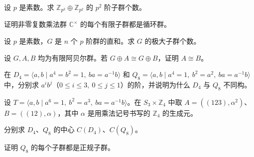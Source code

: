 \noindent\begin{minipage}{\textwidth}
设 $p$ 是素数。求 $\mathbb Z_{p^3}\oplus\mathbb Z_{p^2}$ 的 $p^2$ 阶子群个数。
\end{minipage}\par\vfill
\noindent\begin{minipage}{\textwidth}
证明非零复数乘法群 $\mathbb C^\times$ 的每个有限子群都是循环群。
\end{minipage}\par\vfill
\newpage
\noindent\begin{minipage}{\textwidth}
设 $p$ 是素数，$G$ 是 $n$ 个 $p$ 阶群的直和。求 $G$ 的极大子群个数。
\end{minipage}\par\vfill
\noindent\begin{minipage}{\textwidth}
设 $G,A,B$ 均为有限阿贝尔群。若 $G\oplus A\cong G\oplus B$，证明 $A\cong B$。
\end{minipage}\par\vfill
\noindent\begin{minipage}{\textwidth}
在 $D_4=\langle a,b\mid a^4=b^2=1,\ ba=a^{-1}b\rangle$ 和 $Q_8=\langle a,b\mid a^4=1,\ b^2=a^2,\ ba=a^{-1}b\rangle$ 中，分别求 $a^ib^j$（$0\le i\le3,\ 0\le j\le1$）的阶，并说明为什么 $D_4$ 与 $Q_8$ 不同构。
\end{minipage}\par\vfill
\newpage
\noindent\begin{minipage}{\textwidth}
设 $T=\langle a,b\mid a^6=1,\ b^2=a^3,\ ba=a^{-1}b\rangle$。在 $S_3\times\mathbb Z_4$ 中取 $A=((123),\alpha^2)$、$B=((12),\alpha)$，其中 $\alpha$ 是用乘法记号书写的 $\mathbb Z_4$ 的生成元。
\end{minipage}\par\vfill
\noindent\begin{minipage}{\textwidth}
分别求 $D_4$、$Q_8$ 的中心 $C(D_4)$、$C(Q_8)$。
\end{minipage}\par\vfill
\noindent\begin{minipage}{\textwidth}
证明 $Q_8$ 的每个子群都是正规子群。
\end{minipage}\par\vfill
